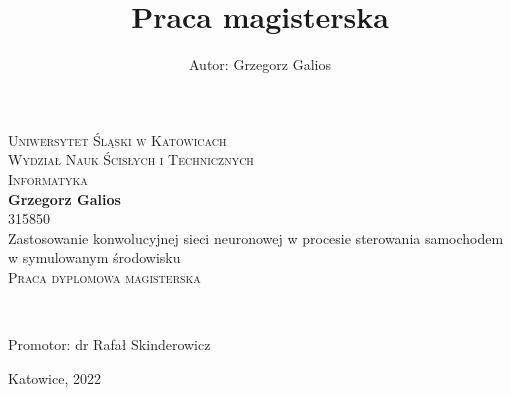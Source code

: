 \newpage
\thispagestyle{empty}

\begin{onehalfspacing}
\begin{center}

\centering
\title{Praca magisterska}
\author{Autor: Grzegorz Galios}

{\fontsize{17}{17}}\selectfont
\textsc{Uniwersytet Śląski w Katowicach \\[.3cm]
Wydział Nauk Ścisłych i Technicznych  \\[.3cm]
Informatyka  \\[2.5cm]}
\textbf{\large{Grzegorz Galios}} \\
315850\\[1cm]

\large 
{Zastosowanie konwolucyjnej sieci neuronowej w procesie sterowania samochodem w symulowanym środowisku} \\[.5cm]
\textsc{Praca dyplomowa magisterska}
\end{center} ~\\[3cm]

\large
\begin{flushright}
Promotor: dr Rafał Skinderowicz \\
\end{flushright}

\begin{bottompar}
\begin{flushright}
Katowice, 2022
\end{flushright}
\end{bottompar}
\end{onehalfspacing}

\setcounter{page}{0} \pagestyle{plain}

\pagestyle{fancy}
